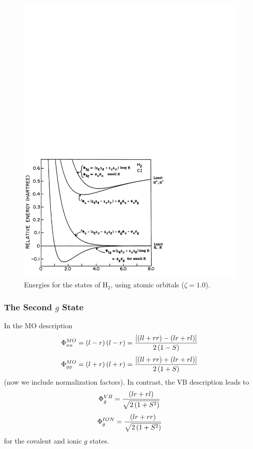 \begin{figure}
\includegraphics[scale=0.75]{fig2-29}
\caption{Energies for the states of H$_2$, using atomic orbitals
  ($\zeta = 1.0$).}
\label{fig2-29}
\end{figure}

\subsubsection{The Second $g$ State}

In the MO description
\begin{equation}
\Phi^{MO}_{uu} = \left( l - r \right) \left( l - r \right) = {\left[ 
\left( ll + rr \right) - \left( lr + rl \right) \right] \over 2 
\left( 1 - S \right)}
\label{eqno2-40a}
\end{equation}
\begin{equation}
\Phi^{MO}_{gg} = \left( l + r \right) \left( l + r \right) = {\left[ 
\left( ll + rr \right) + \left( lr + rl \right) \right] \over 2 
\left( 1 + S \right)}
\label{eqno2-40b}
\end{equation}
(now we include normalization factors). In contrast, the VB
description leads to
\begin{equation}
\Phi^{VB}_g = { \left( l r + r l \right) \over \sqrt{2 \left( 1 + 
S^2 \right)}}
\label{eqno2-41}
\end{equation}
\begin{equation}
\Phi^{ION}_g = { \left( l r + r r \right) \over \sqrt{2 \left( 1 + 
S^2 \right)}}
\end{equation}
for the covalent and ionic $g$ states.
    
